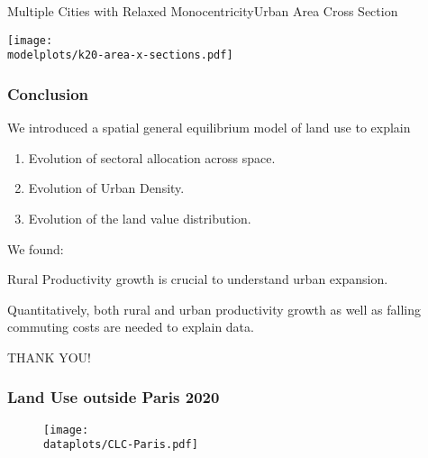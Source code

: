 \documentclass[aspectratio=169]{beamer}
\begin{document}
\begin{frame}{Multiple Cities with Relaxed Monocentricity}{Urban Area Cross Section}
	\begin{adjustbox}{center}
		\texttt{[image: \\modelplots/k20-area-x-sections.pdf]}
	\end{adjustbox}
\end{frame}

\begin{frame}
\frametitle{Conclusion}

We introduced a spatial general equilibrium model of land use to explain

\begin{enumerate}
	\item Evolution of sectoral allocation across space.
	\item Evolution of Urban Density.
	\item Evolution of the land value distribution.
\end{enumerate}

\bigskip
We found: 

\begin{midi}
	\item Rural Productivity growth is crucial to understand urban expansion.
	\item Quantitatively, both rural and urban productivity growth as well as falling commuting costs are needed to explain data.
\end{midi}


\begin{center}
  THANK YOU!
\end{center}
\end{frame}

\beginbackup




\begin{frame}[label=LandUseMeasureParis]
	\frametitle{Land Use outside Paris 2020}
	\begin{figure}
		\begin{center}
			\texttt{[image: \\dataplots/CLC-Paris.pdf]}
		\end{center}
	\end{figure}
	\hspace{-1cm}
	\hyperlink{CLCmeasure}{}\\
\end{frame}
\end{document}
